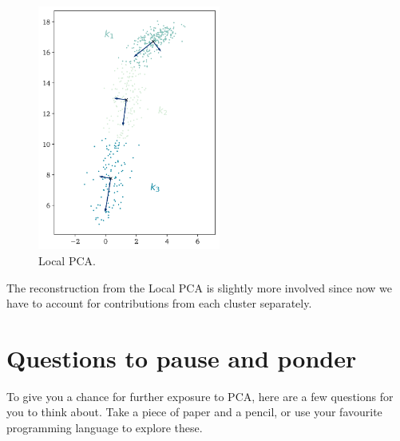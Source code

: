 \documentclass[10pt,twocolumn]{article}
\begin{document}
\begin{figure}[H]
\centering\includegraphics[width=6cm]{lpca-on-nonlinear-data.png}
\caption{Local PCA.}
\label{fig:local-pca}
\end{figure}

The reconstruction from the Local PCA is slightly more involved since now we have to account for contributions from each cluster separately.







\section{Questions to pause and ponder} \label{app:questions}

To give you a chance for further exposure to PCA,  here are a few questions for you to think about. Take a piece of paper and a pencil, or use your favourite programming language to explore these.
\end{document}
